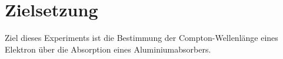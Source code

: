 \section{Zielsetzung}
\label{sec:Zielsetzung}

Ziel dieses Experiments ist die Bestimmung der Compton-Wellenlänge eines Elektron über die Absorption eines Aluminiumabsorbers. 